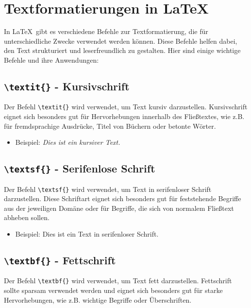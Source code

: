 \section*{Textformatierungen in LaTeX}

In \LaTeX\ gibt es verschiedene Befehle zur Textformatierung, die für
unterschiedliche Zwecke verwendet werden können. Diese Befehle helfen dabei, den
Text strukturiert und leserfreundlich zu gestalten. Hier sind einige wichtige
Befehle und ihre Anwendungen:

\subsection*{\texttt{\textbackslash textit\{\}} - Kursivschrift}

Der Befehl \texttt{\textbackslash textit\{\}} wird verwendet, um Text kursiv
darzustellen. Kursivschrift eignet sich besonders gut für Hervorhebungen
innerhalb des Fließtextes, wie z.B. für fremdsprachige Ausdrücke, Titel von
Büchern oder betonte Wörter.

\begin{itemize}
    \item Beispiel: \textit{Dies ist ein kursiver Text.}
\end{itemize}

\subsection*{\texttt{\textbackslash textsf\{\}} - Serifenlose Schrift}

Der Befehl \texttt{\textbackslash textsf\{\}} wird verwendet, um Text in
serifenloser Schrift darzustellen. Diese Schriftart eignet sich besonders gut
für feststehende Begriffe aus der jeweiligen Domäne oder für Begriffe, die sich
von normalem Fließtext abheben sollen.

\begin{itemize}
    \item Beispiel: \textsf{Dies ist ein Text in serifenloser Schrift.}
\end{itemize}

\subsection*{\texttt{\textbackslash textbf\{\}} - Fettschrift}

Der Befehl \texttt{\textbackslash textbf\{\}} wird verwendet, um Text fett
darzustellen. Fettschrift sollte sparsam verwendet werden und eignet sich
besonders gut für starke Hervorhebungen, wie z.B. wichtige Begriffe oder
Überschriften.

